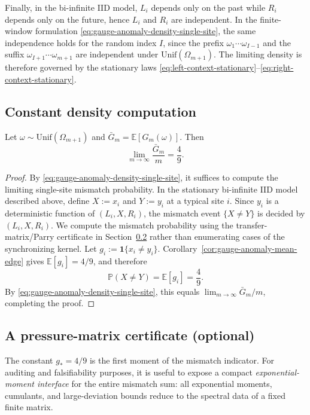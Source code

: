 Finally, in the bi-infinite IID model, $L_i$ depends only on the past while $R_i$ depends only on the future, hence $L_i$ and $R_i$ are independent.
In the finite-window formulation \eqref{eq:gauge-anomaly-density-single-site}, the same independence holds for the random index $I$, since the prefix $\omega_1\cdots\omega_{I-1}$ and the suffix $\omega_{I+1}\cdots\omega_{m+1}$ are independent under $\mathrm{Unif}(\Omega_{m+1})$.
The limiting density is therefore governed by the stationary laws \eqref{eq:left-context-stationary}--\eqref{eq:right-context-stationary}.

\subsection{Constant density computation}\label{app:gauge-anomaly-density-proof}
\begin{theorem}\label{thm:gauge-anomaly-density-49}
Let $\omega\sim\mathrm{Unif}(\Omega_{m+1})$ and $\bar G_m=\mathbb E[G_m(\omega)]$.
Then
\[
\lim_{m\to\infty}\frac{\bar G_m}{m}=\frac{4}{9}.
\]
\end{theorem}
\begin{proof}
By \eqref{eq:gauge-anomaly-density-single-site}, it suffices to compute the limiting single-site mismatch probability.
In the stationary bi-infinite IID model described above, define $X:=x_i$ and $Y:=y_i$ at a typical site $i$.
Since $y_i$ is a deterministic function of $(L_i,X,R_i)$, the mismatch event $\{X\neq Y\}$ is decided by $(L_i,X,R_i)$.
We compute the mismatch probability using the transfer-matrix/Parry certificate in Section~\ref{app:gauge-anomaly-pressure} rather than enumerating cases of the synchronizing kernel.
Let $g_i:=\mathbf 1\{x_i\neq y_i\}$.
Corollary~\ref{cor:gauge-anomaly-mean-edge} gives $\mathbb E[g_i]=4/9$, and therefore
\[
\mathbb P(X\neq Y)=\mathbb E[g_i]=\frac49.
\]
By \eqref{eq:gauge-anomaly-density-single-site}, this equals $\lim_{m\to\infty}\bar G_m/m$, completing the proof.
\end{proof}

\subsection{A pressure-matrix certificate (optional)}\label{app:gauge-anomaly-pressure}
The constant $g_\ast=4/9$ is the first moment of the mismatch indicator.
For auditing and falsifiability purposes, it is useful to expose a compact \emph{exponential-moment interface} for the entire mismatch sum:
all exponential moments, cumulants, and large-deviation bounds reduce to the spectral data of a fixed finite matrix.

